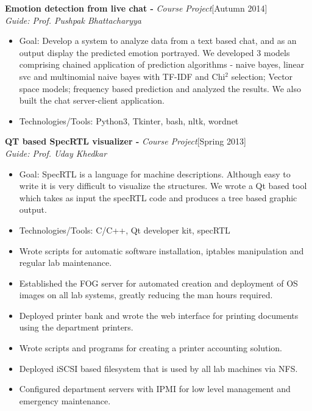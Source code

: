 \documentclass[a4paper,10pt]{article}
\newcommand{\header}[1]{
\begin{center}
\fbox{\begin{minipage}{\textwidth}
\raggedright \large \bf #1
\end{minipage}}
\end{center}
\vspace{-0.3cm}
}
\begin{document}
\noindent
\textbf{Emotion detection from live chat -} \emph{Course Project}\hfill[Autumn 2014] \\
\emph{Guide: Prof. Pushpak Bhattacharyya}
\begin{itemize}
 \item Goal: Develop a system to analyze data from a text based chat, and as an output display the predicted emotion portrayed. We developed 3 models comprising chained application of prediction algorithms - naive bayes, linear svc and multinomial naive bayes with TF-IDF and Chi$^2$ selection; Vector space models; frequency based prediction and analyzed the results. We also built the chat server-client application.
 \item Technologies/Tools: Python3, Tkinter, bash, nltk, wordnet
\end{itemize}

\noindent
\textbf{QT based SpecRTL  visualizer -} \emph{Course Project}\hfill[Spring 2013] \\
\emph{Guide: Prof. Uday Khedkar}
\begin{itemize}
 \item Goal: SpecRTL is a language for machine descriptions. Although easy to write it is very difficult to visualize the structures. We wrote a Qt based tool which takes as input the specRTL code and produces a tree based graphic output.
 \item Technologies/Tools: C/C++, Qt developer kit, specRTL
\end{itemize}
\endgroup

\vspace{-0.8cm}
\header{RA Work - System Administrator}
\vspace{-0.2cm}
\begin{itemize}
 \item Wrote scripts for automatic software installation, iptables manipulation and regular lab maintenance.
 \item Established the FOG server for automated creation and deployment of OS images on all lab systems, greatly reducing the man hours required.
 \item Deployed printer bank and wrote the web interface for printing documents using the department printers.
 \item Wrote scripts and programs for creating a printer accounting solution.
 \item Deployed iSCSI based filesystem that is used by all lab machines via NFS.
 \item Configured department servers with IPMI for low level management and emergency maintenance.
\end{itemize}
\end{document}
